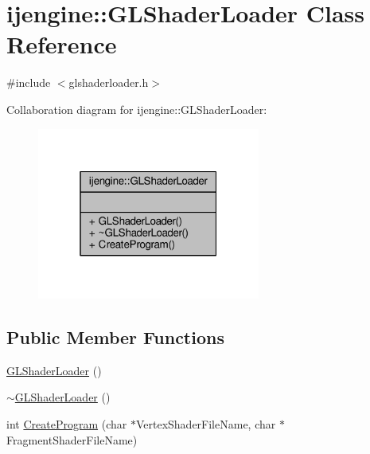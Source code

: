 \hypertarget{classijengine_1_1GLShaderLoader}{\section{ijengine\-:\-:G\-L\-Shader\-Loader Class Reference}
\label{classijengine_1_1GLShaderLoader}
}


{\ttfamily \#include $<$glshaderloader.\-h$>$}



Collaboration diagram for ijengine\-:\-:G\-L\-Shader\-Loader\-:\nopagebreak
\begin{figure}[H]
\begin{center}
\leavevmode
\includegraphics[width=208pt]{classijengine_1_1GLShaderLoader__coll__graph}
\end{center}
\end{figure}
\subsection*{Public Member Functions}
\begin{DoxyCompactItemize}
\item 
\hyperlink{classijengine_1_1GLShaderLoader_a38002836ff384a73f749e7d83efa0c34}{G\-L\-Shader\-Loader} ()
\item 
\hyperlink{classijengine_1_1GLShaderLoader_aac648731a72a6bea8f8d6fddbbb265b8}{$\sim$\-G\-L\-Shader\-Loader} ()
\item 
int \hyperlink{classijengine_1_1GLShaderLoader_afcbca59d7679d91e0d31b00c05a6a5ae}{Create\-Program} (char $\ast$Vertex\-Shader\-File\-Name, char $\ast$Fragment\-Shader\-File\-Name)
\end{DoxyCompactItemize}


